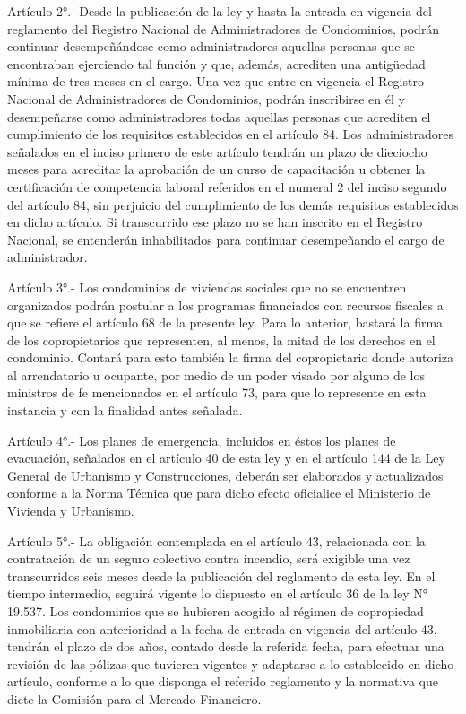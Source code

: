     Artículo 2°.- Desde la publicación de la ley y hasta la entrada en vigencia del reglamento del Registro Nacional de Administradores de Condominios, podrán continuar desempeñándose como administradores aquellas personas que se encontraban ejerciendo tal función y que, además, acrediten una antigüedad mínima de tres meses en el cargo.
    Una vez que entre en vigencia el Registro Nacional de Administradores de Condominios, podrán inscribirse en él y desempeñarse como administradores todas aquellas personas que acrediten el cumplimiento de los requisitos establecidos en el artículo 84.
    Los administradores señalados en el inciso primero de este artículo tendrán un plazo de dieciocho meses para acreditar la aprobación de un curso de capacitación u obtener la certificación de competencia laboral referidos en el numeral 2 del inciso segundo del artículo 84, sin perjuicio del cumplimiento de los demás requisitos establecidos en dicho artículo. Si transcurrido ese plazo no se han inscrito en el Registro Nacional, se entenderán inhabilitados para continuar desempeñando el cargo de administrador.
     
    Artículo 3°.- Los condominios de viviendas sociales que no se encuentren organizados podrán postular a los programas financiados con recursos fiscales a que se refiere el artículo 68 de la presente ley. Para lo anterior, bastará la firma de los copropietarios que representen, al menos, la mitad de los derechos en el condominio. Contará para esto también la firma del copropietario donde autoriza al arrendatario u ocupante, por medio de un poder visado por alguno de los ministros de fe mencionados en el artículo 73, para que lo represente en esta instancia y con la finalidad antes señalada.
     
    Artículo 4°.- Los planes de emergencia, incluidos en éstos los planes de evacuación, señalados en el artículo 40 de esta ley y en el artículo 144 de la Ley General de Urbanismo y Construcciones, deberán ser elaborados y actualizados conforme a la Norma Técnica que para dicho efecto oficialice el Ministerio de Vivienda y Urbanismo.
     
    Artículo 5°.- La obligación contemplada en el artículo 43, relacionada con la contratación de un seguro colectivo contra incendio, será exigible una vez transcurridos seis meses desde la publicación del reglamento de esta ley. En el tiempo intermedio, seguirá vigente lo dispuesto en el artículo 36 de la ley N° 19.537.
    Los condominios que se hubieren acogido al régimen de copropiedad inmobiliaria con anterioridad a la fecha de entrada en vigencia del artículo 43, tendrán el plazo de dos años, contado desde la referida fecha, para efectuar una revisión de las pólizas que tuvieren vigentes y adaptarse a lo establecido en dicho artículo, conforme a lo que disponga el referido reglamento y la normativa que dicte la Comisión para el Mercado Financiero.
     
